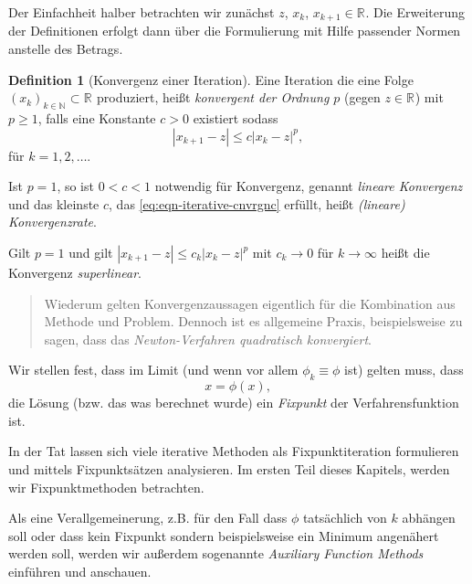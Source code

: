 \documentclass[
]{book}
\newenvironment {JHSAYS} [0] {\begin{quote}\color{jhsc}} {\end{quote}}
\theoremstyle{definition}
\newtheorem{definition}{Definition}[chapter]
\theoremstyle{definition}
\theoremstyle{definition}
\theoremstyle{definition}
\theoremstyle{remark}
\begin{document}
Der Einfachheit halber betrachten wir zunächst \(z\), \(x_k\), \(x_{k+1}\in \mathbb R^{}\).
Die Erweiterung der Definitionen erfolgt dann über die Formulierung mit Hilfe passender Normen anstelle des Betrags.

\begin{definition}[Konvergenz einer Iteration]
\protect\hypertarget{def:iterative-convergence}{}\label{def:iterative-convergence}Eine Iteration die eine Folge \((x_k)_{k\in \mathbb N^{}}\subset \mathbb R^{}\) produziert, heißt \emph{konvergent der Ordnung \(p\)} (gegen \(z\in \mathbb R^{}\)) mit \(p\geq 1\), falls eine Konstante \(c>0\) existiert sodass
\begin{equation}
|x_{k+1} - z| \leq c|x_k-z|^p,
\label{eq:eqn-iterative-cnvrgnc}
\end{equation}
für \(k=1, 2, \dotsc\).

Ist \(p=1\), so ist \(0<c<1\) notwendig für Konvergenz, genannt \emph{lineare Konvergenz} und das kleinste \(c\), das \eqref{eq:eqn-iterative-cnvrgnc} erfüllt, heißt \emph{(lineare) Konvergenzrate}.

Gilt \(p=1\) und gilt \(|x_{k+1} - z| \leq c_k|x_k-z|^p\) mit \(c_k \to 0\) für \(k\to \infty\) heißt die Konvergenz \emph{superlinear}.
\end{definition}

\leavevmode\hypertarget{rem-conv-iterat}{}%
\begin{JHSAYS}
Wiederum gelten Konvergenzaussagen eigentlich für die Kombination aus Methode und Problem. Dennoch ist es allgemeine Praxis, beispielsweise zu sagen, dass das \emph{Newton-Verfahren quadratisch konvergiert}.

\end{JHSAYS}

Wir stellen fest, dass im Limit (und wenn vor allem \(\phi_k \equiv \phi\) ist) gelten muss, dass
\begin{equation*}
x=\phi(x),
\end{equation*}
die Lösung (bzw. das was berechnet wurde) ein \emph{Fixpunkt} der Verfahrensfunktion ist.

In der Tat lassen sich viele iterative Methoden als Fixpunktiteration formulieren und mittels Fixpunktsätzen analysieren. Im ersten Teil dieses Kapitels, werden wir Fixpunktmethoden betrachten.

Als eine Verallgemeinerung, z.B. für den Fall dass \(\phi\) tatsächlich von \(k\) abhängen soll oder dass kein Fixpunkt sondern beispielsweise ein Minimum angenähert werden soll, werden wir außerdem sogenannte \emph{Auxiliary Function Methods} einführen und anschauen.
\end{document}
